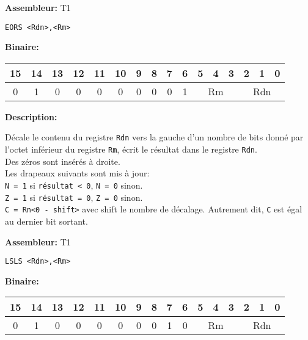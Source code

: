 \documentclass{article}
\begin{document}
    \textbf{Assembleur:} T1

    \begin{lstlisting}
EORS <Rdn>,<Rm>
    \end{lstlisting}

    \textbf{Binaire:}

    \begin{tabular}{| c c c c c c c c c c c c c c c c |}
        \hline
        15 & 14 & 13 & 12 & 11 & 10 & \multicolumn{1}{|c}{9} & 8 & 7 & 6 & \multicolumn{1}{|c}{5} & 4 & 3 & \multicolumn{1}{|c}{2} & 1 & 0 \\
        \hline
        0 & 1 & 0 & 0 & 0 & 0 & \multicolumn{1}{|c}{0} & 0 & 0 & 1 & \multicolumn{3}{|c}{Rm} & \multicolumn{3}{|c|}{Rdn} \\
        \hline
    \end{tabular}



    \textbf{Description: }

    Décale le contenu du registre \texttt{Rdn} vers la gauche d'un nombre de bits donné par l'octet inférieur du registre \texttt{Rm}, écrit le résultat dans le registre \texttt{Rdn}.\\
    Des zéros sont insérés à droite.\\
    Les drapeaux suivants sont mis à jour:\\
    \texttt{N = 1} si \texttt{résultat < 0}, \texttt{N = 0} sinon.\\
    \texttt{Z = 1} si \texttt{résultat = 0}, \texttt{Z = 0} sinon.\\
    \texttt{C = Rn<0 - shift>} avec shift le nombre de décalage.
    Autrement dit, \texttt{C} est égal au dernier bit sortant.

    \textbf{Assembleur:} T1

    \begin{lstlisting}
LSLS <Rdn>,<Rm>
    \end{lstlisting}

    \textbf{Binaire:}

    \begin{tabular}{| c c c c c c c c c c c c c c c c |}
        \hline
        15 & 14 & 13 & 12 & 11 & 10 & \multicolumn{1}{|c}{9} & 8 & 7 & 6 & \multicolumn{1}{|c}{5} & 4 & 3 & \multicolumn{1}{|c}{2} & 1 & 0 \\
        \hline
        0 & 1 & 0 & 0 & 0 & 0 & \multicolumn{1}{|c}{0} & 0 & 1 & 0 & \multicolumn{3}{|c}{Rm} & \multicolumn{3}{|c|}{Rdn} \\
        \hline
    \end{tabular}
\end{document}
